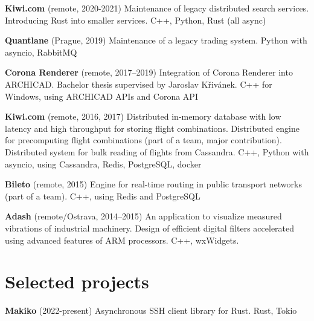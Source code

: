 \documentclass[10pt,a4paper]{article}
\begin{document}
\begin{multicols}{2}
\textbf{Kiwi.com} (remote, 2020-2021)
  \newline Maintenance of legacy distributed search services.
  \newline Introducing Rust into smaller services.
  \newline C++, Python, Rust (all async)

\textbf{Quantlane} (Prague, 2019)
  \newline Maintenance of a legacy trading system.
  \newline Python with asyncio, RabbitMQ

\textbf{Corona Renderer} (remote, 2017–2019)
  \newline Integration of Corona Renderer into ARCHICAD.
  \newline Bachelor thesis supervised by Jaroslav Křivánek.
  \newline C++ for Windows, using ARCHICAD APIs and Corona API

\textbf{Kiwi.com} (remote, 2016, 2017)
  \newline Distributed in-memory database with low latency and high throughput
    for storing flight combinations.
  \newline Distributed engine for precomputing flight combinations (part of a
    team, major contribution).
  \newline Distributed system for bulk reading of flights from Cassandra.
  \newline C++, Python with asyncio, using Cassandra, Redis, PostgreSQL,
    docker

\textbf{Bileto} (remote, 2015)
  \newline Engine for real-time routing in public transport networks (part of a
  team).
  \newline C++, using Redis and PostgreSQL

\columnbreak

\textbf{Adash} (remote/Ostrava, 2014–2015)
  \newline An application to visualize measured vibrations of industrial
  machinery.
  \newline Design of efficient digital filters accelerated using advanced
  features of ARM processors.
  \newline C++, wxWidgets.


\section*{Selected projects}

\textbf{Makiko} (2022-present)
  \newline Asynchronous SSH client library for Rust.
  \newline Rust, Tokio


\end{multicols}
\end{document}
